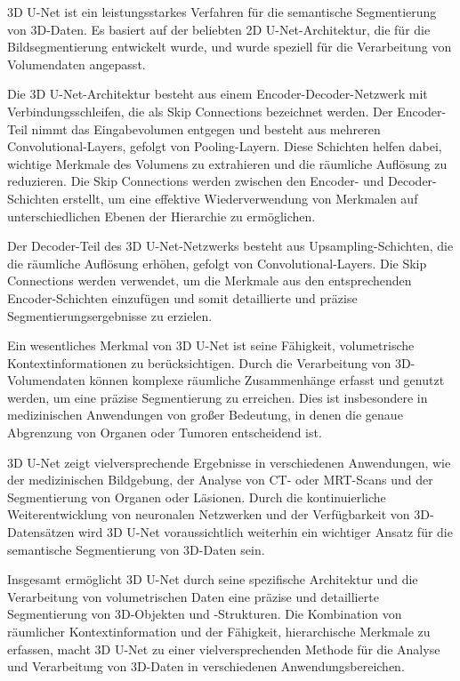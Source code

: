 3D U-Net ist ein leistungsstarkes Verfahren für die semantische Segmentierung von 3D-Daten. Es basiert auf der beliebten 2D U-Net-Architektur, die für die Bildsegmentierung entwickelt wurde, und wurde speziell für die Verarbeitung von Volumendaten angepasst.

Die 3D U-Net-Architektur besteht aus einem Encoder-Decoder-Netzwerk mit
Verbindungsschleifen, die als Skip Connections bezeichnet werden. Der
Encoder-Teil nimmt das Eingabevolumen entgegen und besteht aus mehreren
Convolutional-Layers, gefolgt von Pooling-Layern. Diese Schichten helfen dabei,
wichtige Merkmale des Volumens zu extrahieren und die räumliche Auflösung zu
reduzieren. Die Skip Connections werden zwischen den Encoder- und
Decoder-Schichten erstellt, um eine effektive Wiederverwendung von Merkmalen
auf unterschiedlichen Ebenen der Hierarchie zu ermöglichen.

Der Decoder-Teil des 3D U-Net-Netzwerks besteht aus Upsampling-Schichten, die
die räumliche Auflösung erhöhen, gefolgt von Convolutional-Layers. Die Skip
Connections werden verwendet, um die Merkmale aus den entsprechenden
Encoder-Schichten einzufügen und somit detaillierte und präzise
Segmentierungsergebnisse zu erzielen.

Ein wesentliches Merkmal von 3D U-Net ist seine Fähigkeit, volumetrische
Kontextinformationen zu berücksichtigen. Durch die Verarbeitung von
3D-Volumendaten können komplexe räumliche Zusammenhänge erfasst und genutzt
werden, um eine präzise Segmentierung zu erreichen. Dies ist insbesondere in
medizinischen Anwendungen von großer Bedeutung, in denen die genaue Abgrenzung
von Organen oder Tumoren entscheidend ist.

3D U-Net zeigt vielversprechende Ergebnisse in verschiedenen Anwendungen, wie der medizinischen Bildgebung, der Analyse von CT- oder MRT-Scans und der Segmentierung von Organen oder Läsionen. Durch die kontinuierliche Weiterentwicklung von neuronalen Netzwerken und der Verfügbarkeit von 3D-Datensätzen wird 3D U-Net voraussichtlich weiterhin ein wichtiger Ansatz für die semantische Segmentierung von 3D-Daten sein.

Insgesamt ermöglicht 3D U-Net durch seine spezifische Architektur und die
Verarbeitung von volumetrischen Daten eine präzise und detaillierte
Segmentierung von 3D-Objekten und -Strukturen. Die Kombination von räumlicher
Kontextinformation und der Fähigkeit, hierarchische Merkmale zu erfassen, macht
3D U-Net zu einer vielversprechenden Methode für die Analyse und Verarbeitung
von 3D-Daten in verschiedenen Anwendungsbereichen.
